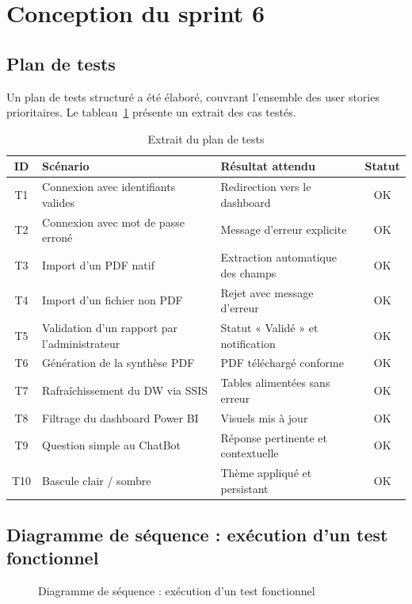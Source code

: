 \section{Conception du sprint 6}

\subsection{Plan de tests}
Un plan de tests structuré a été élaboré, couvrant l'ensemble des user stories
prioritaires. Le tableau~\ref{tab:plan-tests} présente un extrait des cas testés.

\begin{table}[h!]
\centering
\caption{Extrait du plan de tests}
\label{tab:plan-tests}
\renewcommand{\arraystretch}{1.3}
\begin{tabularx}{\textwidth}{|c|X|X|c|}
\hline
\textbf{ID} & \textbf{Scénario} & \textbf{Résultat attendu} & \textbf{Statut} \\ \hline
T1 & Connexion avec identifiants valides & Redirection vers le dashboard & OK \\ \hline
T2 & Connexion avec mot de passe erroné & Message d'erreur explicite & OK \\ \hline
T3 & Import d'un PDF natif & Extraction automatique des champs & OK \\ \hline
T4 & Import d'un fichier non PDF & Rejet avec message d'erreur & OK \\ \hline
T5 & Validation d'un rapport par l'administrateur & Statut « Validé » et notification & OK \\ \hline
T6 & Génération de la synthèse PDF & PDF téléchargé conforme & OK \\ \hline
T7 & Rafraîchissement du DW via SSIS & Tables alimentées sans erreur & OK \\ \hline
T8 & Filtrage du dashboard Power BI & Visuels mis à jour & OK \\ \hline
T9 & Question simple au ChatBot & Réponse pertinente et contextuelle & OK \\ \hline
T10 & Bascule clair / sombre & Thème appliqué et persistant & OK \\ \hline
\end{tabularx}
\end{table}

\subsection{Diagramme de séquence : exécution d'un test fonctionnel}
\begin{figure}[h!]
\centering
{}
\caption{Diagramme de séquence : exécution d'un test fonctionnel}
\end{figure}

